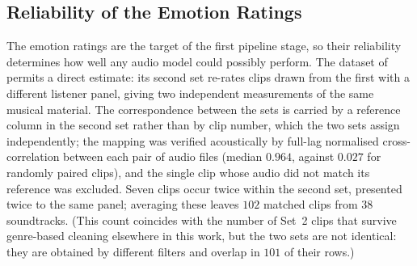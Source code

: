 %

\subsection{Reliability of the Emotion Ratings}
\label{subsec:rating_reliability}

The emotion ratings are the target of the first pipeline stage, so their reliability
determines how well any audio model could possibly perform. The dataset of
\citet{eerola2011comparison} permits a direct estimate: its second set re-rates clips
drawn from the first with a different listener panel, giving two independent measurements
of the same musical material. The correspondence between the sets is carried by a
reference column in the second set rather than by clip number, which the two sets assign
independently; the mapping was verified acoustically by full-lag normalised
cross-correlation between each pair of audio files (median $0.964$, against $0.027$ for
randomly paired clips), and the single clip whose audio did not match its reference was
excluded. Seven clips occur twice within the second set, presented twice to the same
panel; averaging these leaves $102$ matched clips from $38$ soundtracks. (This count
coincides with the number of Set~2 clips that survive genre-based cleaning elsewhere in
this work, but the two sets are not identical: they are obtained by different filters
and overlap in $101$ of their rows.)

